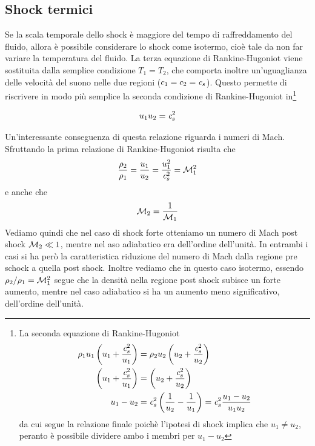 \subsection{Shock termici}
Se la scala temporale dello shock è maggiore del tempo di raffreddamento del fluido, allora è possibile considerare lo shock come isotermo, cioè tale da non far variare la temperatura del fluido. La terza equazione di Rankine-Hugoniot viene sostituita dalla semplice condizione $T_1=T_2$, che comporta inoltre un'uguaglianza delle velocità del suono nelle due regioni ($c_1=c_2= \textit{c}_{s}$). Questo permette di riscrivere in modo più semplice la seconda condizione di Rankine-Hugoniot in\footnote{La seconda equazione di Rankine-Hugoniot \begin{align*}
\rho_1 u_1 \left( u_1 + \dfrac{\textit{c}_{s}^2}{u_1} \right) &= \rho_2 u_2 \left( u_2 + \dfrac{\textit{c}_{s}^2}{u_2} \right) \\
\left( u_1 + \dfrac{\textit{c}_{s}^2}{u_1} \right) &=  \left( u_2 + \dfrac{\textit{c}_{s}^2}{u_2} \right) \\
u_1 - u_2 &= \textit{c}_{s}^2 \left( \dfrac{1}{u_2} - \dfrac{1}{u_1} \right) = \textit{c}_{s}^2 \dfrac{u_1-u_2}{u_1 u_2} 
\end{align*}
da cui segue la relazione finale poichè l'ipotesi di shock implica che $u_1 \neq u_2$, peranto è possibile dividere ambo i membri per $u_1-u_2$
}
\begin{EQ}
\begin{equation}
u_1 u_2 = \textit{c}_{s}^2
\end{equation}
\end{EQ}
Un'interessante conseguenza di questa relazione riguarda i numeri di Mach. Sfruttando la prima relazione di Rankine-Hugoniot risulta che
\begin{equation}
\dfrac{\rho_2}{\rho_1} = \dfrac{u_1}{u_2}=\dfrac{u_1^2}{\textit{c}_{s}^2} = \mathcal{M}_1^2
\end{equation}
e anche che
\begin{equation}
\mathcal{M}_2 = \dfrac{1}{\mathcal{M}_1}
\end{equation}
Vediamo quindi che nel caso di shock forte otteniamo un numero di Mach post shock $\mathcal{M}_2 \ll 1$, mentre nel aso adiabatico era dell'ordine dell'unità. In entrambi i casi si ha però la caratteristica riduzione del numero di Mach dalla regione pre schock a quella post shock. Inoltre vediamo che in questo caso isotermo, essendo $\rho_2/\rho_1 =\mathcal{M}_1^2$ segue che la densità nella regione post shock subisce un forte aumento, mentre nel caso adiabatico si ha un aumento meno significativo, dell'ordine dell'unità.

